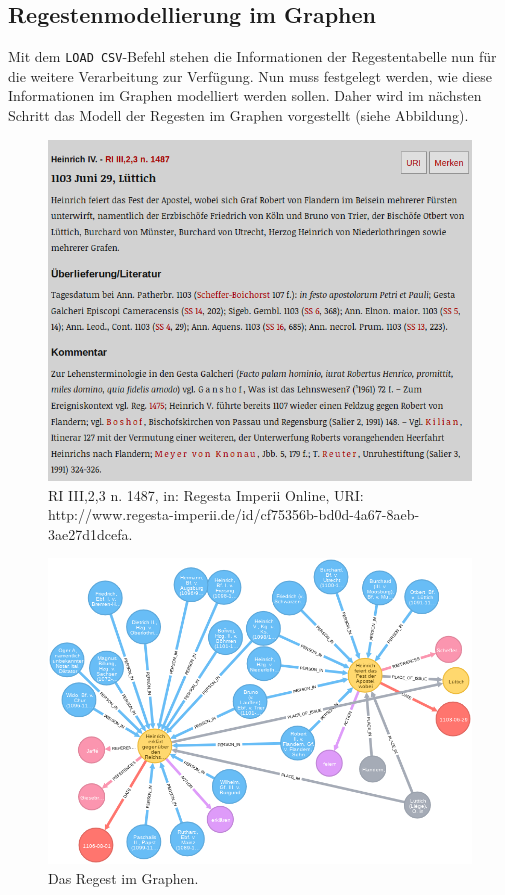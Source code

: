 \documentclass[ngerman,]{scrreprt}
\begin{document}
\subsection{Regestenmodellierung im Graphen}\label{regestenmodellierung-im-graphen-1}

Mit dem \texttt{LOAD\ CSV}-Befehl stehen die Informationen der Regestentabelle nun für die weitere Verarbeitung zur Verfügung. Nun muss festgelegt werden, wie diese Informationen im Graphen modelliert werden sollen. Daher wird im nächsten Schritt das Modell der Regesten im Graphen vorgestellt (siehe Abbildung).

\begin{figure}
\centering
\includegraphics{Bilder/RI2Graph/ReggH4-Nr-1487.png}
\caption{RI III,2,3 n. 1487, in: Regesta Imperii Online, URI: http://www.regesta-imperii.de/id/cf75356b-bd0d-4a67-8aeb-3ae27d1dcefa.}
\end{figure}

\begin{figure}
\centering
\includegraphics{Bilder/RI2Graph/ReggH4-Nr-1487imGraph.png}
\caption{Das Regest im Graphen.}
\end{figure}
\end{document}

